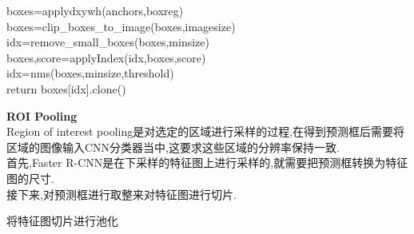 \begin{frame}
    \qquad\textcolor{vscodeparameter}{boxes}=\textcolor{vscodefuncation}{applydxywh}\textcolor{vscodebracket}{(}\textcolor{vscodeparameter}{anchors},\textcolor{vscodeparameter}{boxreg}\textcolor{vscodebracket}{)}\\

    \qquad\textcolor{vscodeparameter}{boxes}=\textcolor{vscodefuncation}{clip\_boxes\_to\_image}\textcolor{vscodebracket}{(}\textcolor{vscodeparameter}{boxes},\textcolor{vscodeparameter}{imagesize}\textcolor{vscodebracket}{)}\\

    \qquad\textcolor{vscodeparameter}{idx}=\textcolor{vscodefuncation}{remove\_small\_boxes}\textcolor{vscodebracket}{(}\textcolor{vscodeparameter}{boxes},\textcolor{vscodeparameter}{minsize}\textcolor{vscodebracket}{)}\\

    \qquad\textcolor{vscodeparameter}{boxes},\textcolor{vscodeparameter}{score}=\textcolor{vscodefuncation}{applyIndex}\textcolor{vscodebracket}{(}\textcolor{vscodeparameter}{idx},\textcolor{vscodeparameter}{boxes},\textcolor{vscodeparameter}{score}\textcolor{vscodebracket}{)}\\

    \qquad\textcolor{vscodeparameter}{idx}=\textcolor{vscodefuncation}{nms}\textcolor{vscodebracket}{(}\textcolor{vscodeparameter}{boxes},\textcolor{vscodeparameter}{minsize},\textcolor{vscodeparameter}{threshold}\textcolor{vscodebracket}{)}\\

    \qquad\textcolor{vscodereturn}{return} \textcolor{vscodeparameter}{boxes}\textcolor{vscodebracket}{[}\textcolor{vscodeparameter}{idx}\textcolor{vscodebracket}{]}.\textcolor{vscodefuncation}{clone}\textcolor{vscodebracket}{(}\textcolor{vscodebracket}{)}
\end{frame}

\begin{frame}
    \vspace{0.5em}
    \noindent\large\textbf{ROI Pooling}\\
    \vspace{0.5em}
    Region of interest pooling是对选定的区域进行采样的过程,在得到预测框后需要将区域的图像输入CNN分类器当中,这要求这些区域的分辨率保持一致.\\
    
    首先,Faster R-CNN是在下采样的特征图上进行采样的,就需要把预测框转换为特征图的尺寸.\\

    接下来,对预测框进行取整来对特征图进行切片.

    将特征图切片进行池化
\end{frame}

